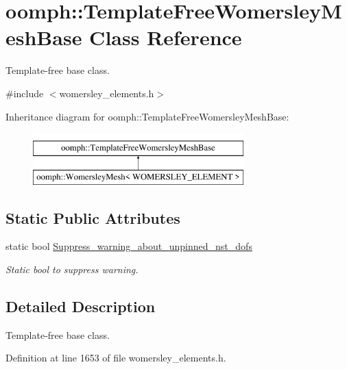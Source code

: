 \hypertarget{classoomph_1_1TemplateFreeWomersleyMeshBase}{}\section{oomph\+:\+:Template\+Free\+Womersley\+Mesh\+Base Class Reference}
\label{classoomph_1_1TemplateFreeWomersleyMeshBase}


Template-\/free base class.  




{\ttfamily \#include $<$womersley\+\_\+elements.\+h$>$}

Inheritance diagram for oomph\+:\+:Template\+Free\+Womersley\+Mesh\+Base\+:\begin{figure}[H]
\begin{center}
\leavevmode
\includegraphics[height=2.000000cm]{classoomph_1_1TemplateFreeWomersleyMeshBase}
\end{center}
\end{figure}
\subsection*{Static Public Attributes}
\begin{DoxyCompactItemize}
\item 
static bool \hyperlink{classoomph_1_1TemplateFreeWomersleyMeshBase_acafc84fe27a65ac15185aebc1a4d0974}{Suppress\+\_\+warning\+\_\+about\+\_\+unpinned\+\_\+nst\+\_\+dofs}
\begin{DoxyCompactList}\small\item\em Static bool to suppress warning. \end{DoxyCompactList}\end{DoxyCompactItemize}


\subsection{Detailed Description}
Template-\/free base class. 

Definition at line 1653 of file womersley\+\_\+elements.\+h.



